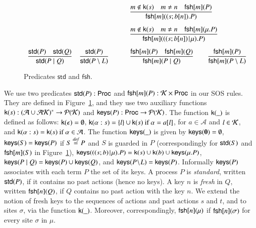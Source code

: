 {\begin{figure}[t]
\[\begin{array}{ll}
\qquad &
\Rule
{m \notin \kkey{s} \quad m \neq n \quad \fresh{m}{P}}
{\fresh{m}{(s;b[n]).P}}
\\[15pt]
%
&
\Rule
{m \notin \kkey{s} \quad m \neq n \quad \fresh{m}{\mu.P}}
{\fresh{m}{((s;b[n])\Mid \mu).P}}
\\[15pt]
\Rule
{\std{P} \quad \std{Q}}
{\std{P \paral Q}}\quad 
\Rule
{\std{P}}
{\std{P \setminus L}}
\qquad &
\Rule
{\fresh{m}{P} \quad \fresh{m}{Q}}
{\fresh{m}{P \paral Q}}
\qquad 
\Rule
{\fresh{m}{P}}
{\fresh{m}{P \setminus L}}
\end{array}
\] 
\caption{Predicates $\mathsf{std}$ and $\mathsf{fsh}$.} 
\label{fig:predicates}
\end{figure}
%
%
We use two predicates $\mathsf{std}(P):\mathsf{Proc}$ and $\mathsf{fsh}[m](P):\mathcal{K} \times \mathsf{Proc}$ in our SOS rules. 
They are defined in Figure~\ref{fig:predicates}, and they use two auxiliary functions
$\mathsf{k}(s): (\mathcal{A}\cup\mathcal{AK})^* \rightarrow \mathcal{P}(\mathcal{K})$ and
$\mathsf{keys}(P): \mathsf{Proc} \rightarrow \mathcal{P}(\mathcal{K})$. 
%
The function $\mathsf{k}(\_)$ is defined as follows:
$\mathsf{k}(\epsilon)=\emptyset$, $\mathsf{k}(\alpha:s)=\{l\}\cup\mathsf{k}(s) \text{ if }\alpha=a[l]$, for 
$a\in \mathcal{A}$ and $l\in \mathcal{K}$, and $\mathsf{k}(\alpha:s)= \mathsf{k}(s) \text{ if }\alpha \in \mathcal{A}$.
%
The function $\mathsf{keys}(\_)$ is given by $\mathsf{keys}(\mathbf{0})=\emptyset$, $\mathsf{keys}(S)=\mathsf{keys}(P)$ if $S\stackrel{\emph{def}}{=} P$ and $S$ is guarded in $P$
(correspondingly for $\mathsf{std}(S)$ and $\mathsf{fsh}[m](S)$ in Figure~\ref{fig:predicates}), 
$\mathsf{keys}(((s;b)\!\mid\! \mu).P)=\mathsf{k}(s) \cup \mathsf{k}(b) \cup \mathsf{keys}(\mu.P)$, $\mathsf{keys}(P \; \vert \; Q)= \mathsf{keys}(P) \cup \mathsf{keys}(Q)$, and $\mathsf{keys}(P \!\setminus\!L)=\mathsf{keys}(P)$. Informally $\mathsf{keys}(P)$ associates with each term $P$ the set of its keys. 
A process $P$ is \emph{standard}, written $\mathsf{std}(P)$, if it contains no past actions (hence no keys). 
A key $n$ is \emph{fresh} in $Q$, written $\mathsf{fsh}[n](Q)$, if $Q$ contains no past action with the key $n$.
We extend the notion of fresh keys to the sequences of actions and past actions $s$ and $t$, and to sites $\sigma$, 
via the function $\mathsf{k}(\_)$. Moreover, correspondingly, $\mathsf{fsh}[n](\mu)$ if $\mathsf{fsh}[n](\sigma)$ for every
site $\sigma$ in $\mu$. 

}
